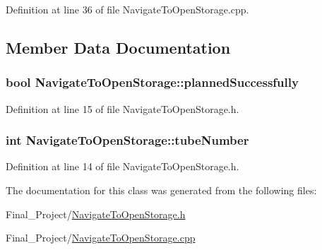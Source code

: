 Definition at line 36 of file Navigate\-To\-Open\-Storage.\-cpp.



\subsection{Member Data Documentation}
\hypertarget{classNavigateToOpenStorage_adcfea0b7edb288b5703100d75828d323}{
\subsubsection[{planned\-Successfully}]{\setlength{\rightskip}{0pt plus 5cm}bool Navigate\-To\-Open\-Storage\-::planned\-Successfully\hspace{0.3cm}{\ttfamily [private]}}}\label{classNavigateToOpenStorage_adcfea0b7edb288b5703100d75828d323}


Definition at line 15 of file Navigate\-To\-Open\-Storage.\-h.

\hypertarget{classNavigateToOpenStorage_a5764847b0cd26e7689b7664f1a83a940}{
\subsubsection[{tube\-Number}]{\setlength{\rightskip}{0pt plus 5cm}int Navigate\-To\-Open\-Storage\-::tube\-Number\hspace{0.3cm}{\ttfamily [private]}}}\label{classNavigateToOpenStorage_a5764847b0cd26e7689b7664f1a83a940}


Definition at line 14 of file Navigate\-To\-Open\-Storage.\-h.



The documentation for this class was generated from the following files\-:\begin{DoxyCompactItemize}
\item 
Final\-\_\-\-Project/\hyperlink{NavigateToOpenStorage_8h}{Navigate\-To\-Open\-Storage.\-h}\item 
Final\-\_\-\-Project/\hyperlink{NavigateToOpenStorage_8cpp}{Navigate\-To\-Open\-Storage.\-cpp}\end{DoxyCompactItemize}
